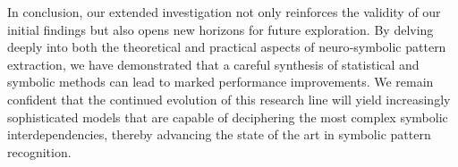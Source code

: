 \documentclass{article}
\begin{document}
\bigskip

In conclusion, our extended investigation not only reinforces the validity of our initial findings but also opens new horizons for future exploration. By delving deeply into both the theoretical and practical aspects of neuro‐symbolic pattern extraction, we have demonstrated that a careful synthesis of statistical and symbolic methods can lead to marked performance improvements. We remain confident that the continued evolution of this research line will yield increasingly sophisticated models that are capable of deciphering the most complex symbolic interdependencies, thereby advancing the state of the art in symbolic pattern recognition.

\bigskip
\end{document}
